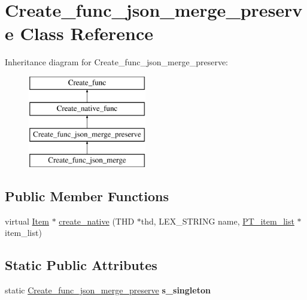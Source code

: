 \hypertarget{classCreate__func__json__merge__preserve}{}\section{Create\+\_\+func\+\_\+json\+\_\+merge\+\_\+preserve Class Reference}
\label{classCreate__func__json__merge__preserve}
Inheritance diagram for Create\+\_\+func\+\_\+json\+\_\+merge\+\_\+preserve\+:\begin{figure}[H]
\begin{center}
\leavevmode
\includegraphics[height=4.000000cm]{classCreate__func__json__merge__preserve}
\end{center}
\end{figure}
\subsection*{Public Member Functions}
\begin{DoxyCompactItemize}
\item 
virtual \mbox{\hyperlink{classItem}{Item}} $\ast$ \mbox{\hyperlink{classCreate__func__json__merge__preserve_a1d77a769bfdb6bd100ab55ea085322a6}{create\+\_\+native}} (T\+HD $\ast$thd, L\+E\+X\+\_\+\+S\+T\+R\+I\+NG name, \mbox{\hyperlink{classPT__item__list}{P\+T\+\_\+item\+\_\+list}} $\ast$item\+\_\+list)
\end{DoxyCompactItemize}
\subsection*{Static Public Attributes}
\begin{DoxyCompactItemize}
\item 
\mbox{\label{classCreate__func__json__merge__preserve_aab6a35a8272e267efa1b707e4bbf71ef}} 
static \mbox{\hyperlink{classCreate__func__json__merge__preserve}{Create\+\_\+func\+\_\+json\+\_\+merge\+\_\+preserve}} {\bfseries s\+\_\+singleton}
\end{DoxyCompactItemize}
